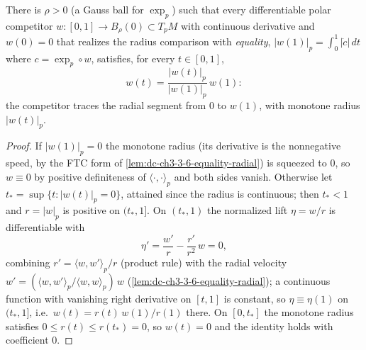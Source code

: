 \begin{lemma}
  \label{lem:dc-ch3-3-6-equality-ray}
  \leanok
  There is $\rho>0$ (a Gauss ball for $\exp_p$) such that every
  differentiable polar competitor $w:[0,1]\to B_\rho(0)\subset T_pM$ with
  continuous derivative and $w(0)=0$ that realizes the radius comparison with
  \emph{equality}, $|w(1)|_p=\int_0^1|\dot c|\,dt$ where $c=\exp_p\circ w$,
  satisfies, for every $t\in[0,1]$,
  $$w(t)=\frac{|w(t)|_p}{|w(1)|_p}\,w(1):$$
  the competitor traces the radial segment from $0$ to $w(1)$, with monotone
  radius $|w(t)|_p$.
\end{lemma}
\begin{proof}
  \sketch
  \leanok
  If $|w(1)|_p=0$ the monotone radius (its derivative is the nonnegative
  speed, by the FTC form of \cref{lem:dc-ch3-3-6-equality-radial}) is
  squeezed to $0$, so $w\equiv0$ by positive definiteness of
  $\langle\cdot,\cdot\rangle_p$ and both sides vanish. Otherwise let
  $t_*=\sup\{t:|w(t)|_p=0\}$, attained since the radius is continuous; then
  $t_*<1$ and $r=|w|_p$ is positive on $(t_*,1]$. On $(t_*,1)$ the
  normalized lift $\eta=w/r$ is differentiable with
  $$\eta'=\frac{w'}{r}-\frac{r'}{r^2}\,w=0,$$
  combining $r'=\langle w,w'\rangle_p/r$ (product rule) with the radial
  velocity $w'=(\langle w,w'\rangle_p/\langle w,w\rangle_p)\,w$
  (\cref{lem:dc-ch3-3-6-equality-radial}); a continuous function with
  vanishing right derivative on $[t,1]$ is constant, so $\eta\equiv\eta(1)$
  on $(t_*,1]$, i.e.\ $w(t)=r(t)\,w(1)/r(1)$ there. On $[0,t_*]$ the
  monotone radius satisfies $0\le r(t)\le r(t_*)=0$, so $w(t)=0$ and the
  identity holds with coefficient $0$.
\end{proof}

